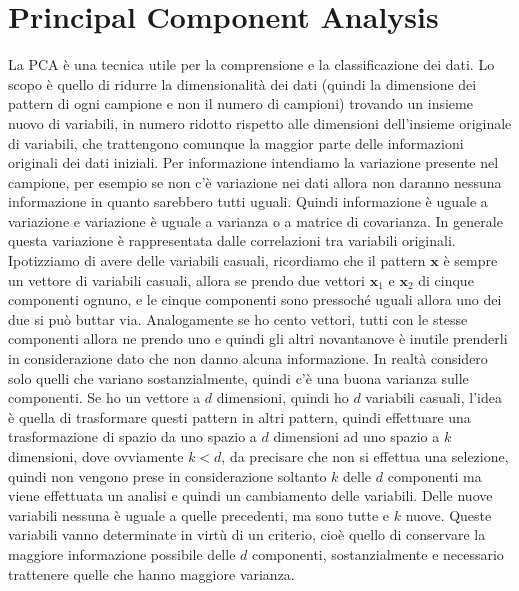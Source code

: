 \section{Principal Component Analysis}
La PCA è una tecnica utile per la comprensione e la classificazione dei dati. Lo scopo è quello di ridurre la dimensionalità dei dati (quindi la dimensione dei pattern di ogni campione e non il numero di campioni)  trovando un insieme nuovo di variabili, in numero ridotto rispetto alle dimensioni dell'insieme originale di variabili, che trattengono comunque la maggior parte delle informazioni originali dei dati iniziali. Per informazione intendiamo la variazione presente nel campione, per esempio se non c'è variazione nei dati allora non daranno nessuna informazione in quanto sarebbero tutti uguali. Quindi informazione è uguale a variazione e variazione è uguale a varianza o a matrice di covarianza. In generale questa variazione è rappresentata dalle correlazioni tra variabili originali. Ipotizziamo di avere delle variabili casuali, ricordiamo che il pattern $\mathbf{x}$ è sempre un vettore di variabili casuali, allora se prendo due vettori $\mathbf{x}_1$ e $\mathbf{x}_2$ di cinque componenti ognuno, e le cinque componenti sono pressoché uguali allora uno dei due si può buttar via. Analogamente se ho cento vettori, tutti con le stesse componenti allora ne prendo uno e quindi gli altri novantanove è inutile prenderli in considerazione dato che non danno alcuna informazione. In realtà considero solo quelli che variano sostanzialmente, quindi c'è una buona varianza sulle componenti. Se ho un vettore a $d$ dimensioni, quindi ho $d$ variabili casuali, l'idea è quella di trasformare questi pattern in altri pattern, quindi effettuare una trasformazione di spazio da uno spazio a $d$ dimensioni ad uno spazio a $k$ dimensioni, dove ovviamente $k < d$, da precisare che non si effettua una selezione, quindi non vengono prese in considerazione soltanto $k$ delle $d$ componenti ma viene effettuata un analisi e quindi un cambiamento delle variabili. Delle nuove variabili nessuna è uguale a quelle precedenti, ma sono tutte e $k$ nuove. Queste variabili vanno determinate in virtù di un criterio, cioè quello di conservare la maggiore informazione possibile delle $d$ componenti, sostanzialmente e necessario trattenere quelle che hanno maggiore varianza.\\

